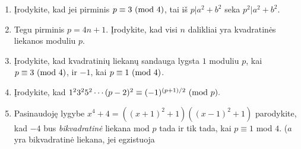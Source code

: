 \begin{enumerate}
  \item Įrodykite, kad jei pirminis $p\equiv 3 \ (\text{mod } 4)$, tai iš $p|a^2 + b^2$
    seka $p^2|a^2 + b^2$.
  \item Tegu pirminis $p = 4n+1$. Įrodykite, kad visi $n$ dalikliai yra
    kvadratinės liekanos moduliu $p$.
  \item Įrodykite, kad kvadratinių liekanų sandauga lygsta $1$ moduliu $p$, kai
    $p\equiv 3\ (\text{mod } 4)$, ir $-1$, kai $p\equiv 1\ (\text{mod } 4)$.
  \item Įrodykite, kad $1^2 3^2 5^2\cdots (p-2)^2 \equiv
    (-1)^{(p+1)/2}\ (\text{mod } p).$
  \item Pasinaudoję lygybe $x^4 + 4 = ((x+1)^2+1)((x-1)^2+1)$ parodykite,
    kad $-4$ bus \textit{bikvadratinė} liekana mod $p$ tada ir tik tada,
    kai $p \equiv 1$ mod $4$. ($a$ yra bikvadratinė liekana, jei egzistuoja

\end{enumerate}
